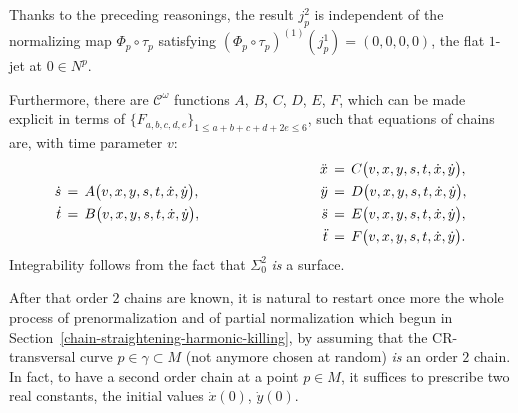 \documentclass[12pt,twoside,leqno,openany]{amsart}
\begin{document}
Thanks to the preceding reasonings, the result $j_p^2$ is
independent of the normalizing map 
$\Phi_p \circ \tau_p$ 
satisfying ${(\Phi_p \circ \tau_p)}^{(1)} (j_p^1) = (0,0,0,0)$,
the flat $1$-jet at $0 \in N^p$. 

Furthermore, there are $\mathcal{C}^\omega$ functions
$A$, $B$, $C$, $D$, $E$, $F$, which can
be made explicit in terms of $\big\{ F_{a,b,c,d,e} \big\}_{
1 \leqslant a+b+c+d+2e \leqslant 6}$,
such that equations of chains are, with time parameter $v$:
\[
\aligned
\dot{s}
&
\,=\,
A\big(v,x,y,s,t,\dot{x},\dot{y}\big),
\\
\dot{t}
&
\,=\,
B\big(v,x,y,s,t,\dot{x},\dot{y}\big),
\endaligned
\ \ \ \ \ \ \ \ \ \ \ \ \ \ \ \ \ \ \ \ \ \ \ \ \ \
\aligned
\ddot{x}
&
\,=\,
C\big(v,x,y,s,t,\dot{x},\dot{y}\big),
\\
\ddot{y}
&
\,=\,
D\big(v,x,y,s,t,\dot{x},\dot{y}\big),
\\
\ddot{s}
&
\,=\,
E\big(v,x,y,s,t,\dot{x},\dot{y}\big),
\\
\ddot{t}
&
\,=\,
F\big(v,x,y,s,t,\dot{x},\dot{y}\big).
\endaligned
\]
Integrability follows from the fact that $\Sigma_0^2$ {\em is}
a surface.

After that order $2$ chains are known, it is natural
to restart once more the whole process of prenormalization
and of partial normalization which begun in 
Section~{\ref{chain-straightening-harmonic-killing}},
by assuming that the CR-transversal
curve $p \in \gamma \subset M$
(not anymore chosen at random)
{\em is} an order $2$ chain.
In fact, to have a second order chain at a point
$p \in M$, it suffices
to prescribe two real constants, the initial values
$\dot{x}(0)$, $\dot{y}(0)$.

\smallskip
\end{document}
